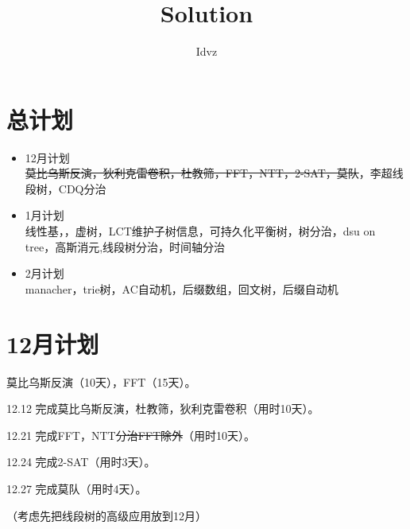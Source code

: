 \documentclass{ctexart}
\title{Solution}
\author{Idvz}
\begin{document}
\date{}
\maketitle





\section{总计划}
\begin{itemize}
\item 12月计划\\
  \sout{莫比乌斯反演，狄利克雷卷积，杜教筛，FFT，NTT，2-SAT，莫队}，李超线段树，CDQ分治
\item 1月计划\\
  线性基，，虚树，LCT维护子树信息，可持久化平衡树，树分治，dsu on tree，高斯消元,线段树分治，时间轴分治
\item 2月计划\\
  manacher，trie树，AC自动机，后缀数组，回文树，后缀自动机
\end{itemize}
  

\section{12月计划}

莫比乌斯反演（10天），FFT（15天）。

12.12 完成莫比乌斯反演，杜教筛，狄利克雷卷积（用时10天）。

12.21 完成FFT，NTT\sout{分治FFT除外}（用时10天）。

12.24 完成2-SAT（用时3天）。

12.27 完成莫队（用时4天）。

（考虑先把线段树的高级应用放到12月）
\end{document}
